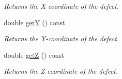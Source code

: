 \begin{DoxyCompactItemize}
\begin{DoxyCompactList}\small\item\em Returns the X-\/coordinate of the defect. \end{DoxyCompactList}\item 
double \hyperlink{classDefect_ae307725c160984f44832fce5af896789}{get\-Y} () const 
\begin{DoxyCompactList}\small\item\em Returns the Y-\/coordinate of the defect. \end{DoxyCompactList}\item 
double \hyperlink{classDefect_a56e4a61e93d01dd765a921e3828af6c4}{get\-Z} () const 
\begin{DoxyCompactList}\small\item\em Returns the Z-\/coordinate of the defect. \end{DoxyCompactList}\end{DoxyCompactItemize}
